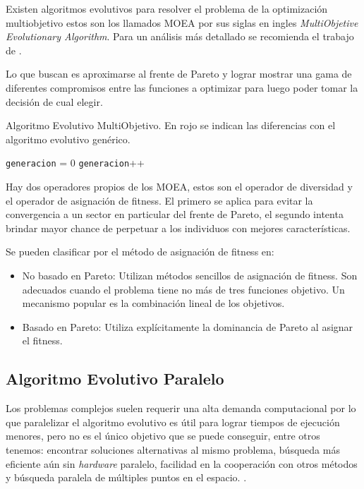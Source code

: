 Existen algoritmos evolutivos para resolver el problema de la optimización multiobjetivo estos son los llamados MOEA por sus siglas en ingles \emph{ MultiObjetive Evolutionary Algorithm}. Para un análisis más detallado se recomienda el trabajo de \citet{Deb2001}.

Lo que buscan es aproximarse al frente de Pareto y lograr mostrar una gama de diferentes compromisos entre las funciones a optimizar para luego poder tomar la decisión de cual elegir.


\begin{algorithm}%
	\caption{Algoritmo Evolutivo MultiObjetivo. En rojo se indican las diferencias con el algoritmo evolutivo genérico.}
	\label{alg:algoritmo_genetico_multiobjetivo}
	\begin{algorithmic} [1] 
		{
			\STATE \texttt{generacion} = 0
			\STATE {\textcolor{red}{Operador Diversidad (Pob(generacion))}}
			\STATE {\textcolor{red}{Asignar Fitness (Pob(generacion))}}
			\STATE \texttt{generacion}++
			\ENDWHILE
			\RETURN 	{\textcolor{red}{Frente de Pareto}}
		}
	\end{algorithmic}
\end{algorithm}

Hay dos operadores propios de los MOEA, estos son el operador de diversidad y el operador de asignación de fitness. El primero se aplica para evitar la convergencia a un sector en particular del frente de Pareto, el segundo intenta brindar mayor chance de perpetuar a los individuos con mejores características.

Se pueden clasificar por el método de asignación de fitness en:
\begin{itemize}
	\item No basado en Pareto: Utilizan métodos sencillos de asignación de fitness. Son adecuados cuando el problema tiene no más de tres funciones objetivo. Un mecanismo popular es la combinación lineal de los objetivos.
	\item Basado en Pareto: Utiliza explícitamente la dominancia de Pareto al asignar el fitness.
\end{itemize}



\subsection{Algoritmo Evolutivo Paralelo}
Los problemas complejos suelen requerir una alta demanda computacional por lo que paralelizar el algoritmo evolutivo es útil para lograr tiempos de ejecución menores, pero no es el único objetivo que se puede conseguir, entre otros tenemos:  encontrar soluciones alternativas al mismo problema, búsqueda más eficiente aún sin \emph{hardware} paralelo, facilidad en la cooperación con otros métodos y búsqueda paralela de múltiples puntos en el espacio. \citep{Alba2002}. 


